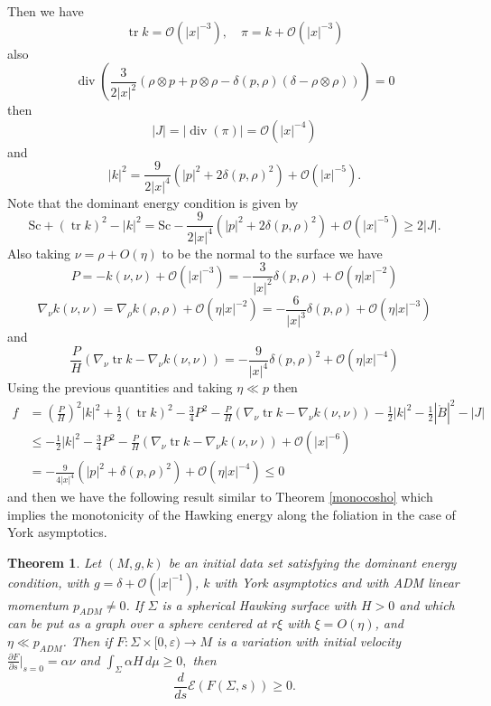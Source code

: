 \documentclass[12pt,a4paper]{amsart}
\theoremstyle{plain}
\newtheorem{theorem}{Theorem}[section]
\theoremstyle{definition}
\newcommand{\diver}{\operatorname{div}}
\newcommand{\tr}{\operatorname{tr}}
\begin{document}
Then we have 
$$\tr k = \mathcal{O}(|x|^{-3}), \quad \pi = k +\mathcal{O}(|x|^{-3})  $$
also 
$$ \diver (\frac{3}{2|x|^2} \left( \rho \otimes p + p \otimes \rho - \delta( p, \rho ) (\delta - \rho \otimes \rho) \right))=0$$
then
$$|J|= | \diver (\pi)|= \mathcal{O} ( |x|^{-4})$$
and
$$|k|^2= \frac{9}{2 |x|^4} (|p|^2 +2 \delta( p, \rho )^2) + \mathcal{O} (|x|^{-5}).$$
Note that  the dominant energy condition  is given by 
$$\mathrm{Sc} + (\tr k)^2 - |k|^2= \mathrm{Sc}- \frac{9}{2 |x|^4} (|p|^2 +2 \delta( p, \rho )^2) + \mathcal{O} (|x|^{-5}) \geq  2|J|. $$
 Also taking $\nu= \rho +O(\eta)$ to be the normal to the surface  we have 
$$P=-k(\nu,\nu)+ \mathcal{O}(|x|^{-3})=-\frac{3}{|x|^2} \delta( p, \rho ) +  \mathcal{O}(\eta |x|^{-2})$$
$$ \nabla_\nu k(\nu,\nu ) =\nabla_\rho k(\rho,\rho ) +  \mathcal{O}(\eta |x|^{-2})= -\frac{6}{|x|^3}  \delta( p, \rho ) +  \mathcal{O}(\eta|x|^{-3}) $$
and 
$$ \frac{P}{H}( \nabla_\nu \tr k - \nabla_\nu k(\nu,\nu )) =- \frac{9}{|x|^4} \delta( p, \rho )^2 +  \mathcal{O}(\eta|x|^{-4})$$
Using the previous quantities and  taking $\eta \ll p$ then
\begin{equation}
\begin{split}
        f&= \left( \frac{P}{H}\right)^2|k|^2+ \frac{1}{2 }(\tr k)^2    - \frac{3}{4} P^2- \frac{P}{H}( \nabla_\nu \tr k - \nabla_\nu k(\nu,\nu )) -  \frac{1}{2} |k|^2  -\frac{1}{2} |\mathring{B}|^2 -|J| \\
        &\leq   -  \frac{1}{2} |k|^2    - \frac{3}{4} P^2- \frac{P}{H}( \nabla_\nu \tr k - \nabla_\nu k(\nu,\nu )) +\mathcal{O} ( |x|^{-6})\\  
        &=   -\frac{9}{4|x|^4}(|p|^2 + \delta( p, \rho )^2 ) +\mathcal{O} (\eta |x|^{-4}) \leq 0    
\end{split}
\end{equation}
and then we have the following result similar to Theorem \ref{monocosho}  which implies the monotonicity of the Hawking energy along the foliation in the case of York asymptotics.
\begin{theorem}\label{monoyork}
    Let $(M,g,k)$ be an initial data set satisfying the dominant energy condition,  with $g=\delta + \mathcal{O}(|x|^{-1}) $, $k$ with York asymptotics and with ADM linear momentum $p_{ADM} \neq 0$. If \( \Sigma \) is a spherical Hawking surface  with \( H > 0 \) and which can be put as a graph over a sphere centered at $r \xi$ with $\xi=O(\eta)$, and $\eta \ll p_{ADM}$. Then if \( F : \Sigma \times [0, \varepsilon) \rightarrow M \) is a variation with initial velocity \( \frac{\partial F}{\partial s} \Big|_{s=0} = \alpha \nu \) and $\int_{\Sigma} \alpha H \, d\mu \geq 0,$ then 
$$ \frac{d}{ds} \mathcal{E} (F(\Sigma, s)) \geq 0. $$
\end{theorem}
\end{document}
